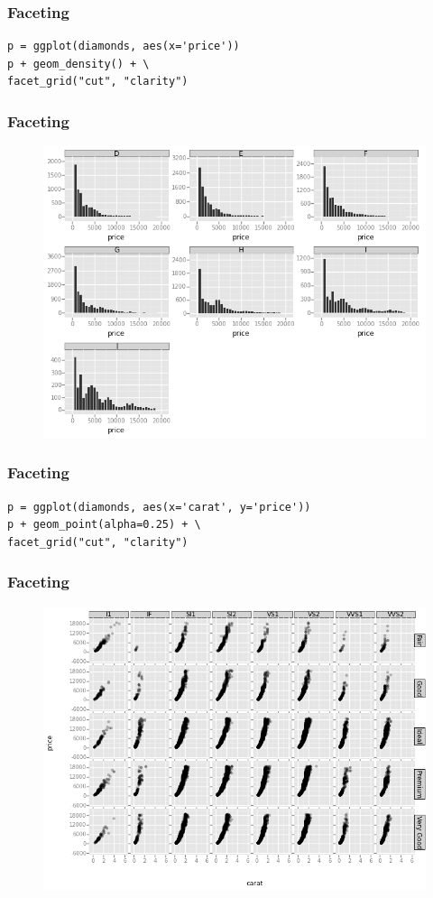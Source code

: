 \documentclass{beamer}
\begin{document}
\begin{frame}[fragile]
	\frametitle{Faceting}
	\begin{framed}
		\begin{verbatim}
p = ggplot(diamonds, aes(x='price'))
p + geom_density() + \
facet_grid("cut", "clarity")
		\end{verbatim}
		
	\end{framed}
\end{frame}
\begin{frame}
\frametitle{Faceting}
	\begin{figure}
		\centering
		\includegraphics[width=0.7\linewidth]{Facet3}
		\caption{}
		\label{fig:Facet3}
	\end{figure}
	
\end{frame}
\begin{frame}[fragile]
\frametitle{Faceting}
	\begin{framed}
		\begin{verbatim}
p = ggplot(diamonds, aes(x='carat', y='price'))
p + geom_point(alpha=0.25) + \
facet_grid("cut", "clarity")
	\end{verbatim}
	
\end{framed}
\end{frame}
\begin{frame}
\frametitle{Faceting}
	\begin{figure}
\centering
\includegraphics[width=0.7\linewidth]{Facet4}
\caption{}
\label{fig:Facet4}
\end{figure}

\end{frame}
\end{document}
